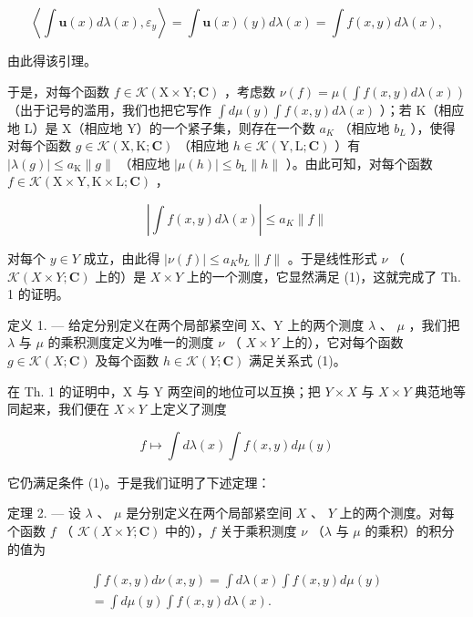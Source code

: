 \[
\left\langle \int \mathbf {u} (x) d \lambda (x), \varepsilon_ {y} \right\rangle = \int \mathbf {u} (x) (y) d \lambda (x) = \int f (x, y) d \lambda (x),
\]

由此得该引理。

于是，对每个函数 \(f \in \mathcal{K}(\mathrm{X} \times \mathrm{Y}; \mathbf{C})\) ，考虑数 \(\nu(f) = \mu\left(\int f(x, y) d\lambda(x)\right)\) （出于记号的滥用，我们也把它写作 \(\int d\mu(y) \int f(x, y) d\lambda(x)\) ）；若 K（相应地 L）是 X（相应地 Y）的一个紧子集，则存在一个数 \(a_{K}\) （相应地 \(b_{L}\) ），使得对每个函数 \(g \in \mathcal{K}(\mathrm{X}, \mathrm{K}; \mathbf{C})\) （相应地 \(h \in \mathcal{K}(\mathrm{Y}, \mathrm{L}; \mathbf{C})\) ）有 \(|\lambda(g)| \leqslant a_{\mathrm{K}} \|g\|\) （相应地 \(|\mu(h)| \leqslant b_{\mathrm{L}} \|h\|\) ）。由此可知，对每个函数 \(f \in \mathcal{K}(\mathrm{X} \times \mathrm{Y}, \mathrm{K} \times \mathrm{L}; \mathbf{C})\) ，

\[
\left| \int f (x, y) d \lambda (x) \right| \leqslant a _ {K} \| f \|
\]

对每个 \(y \in Y\) 成立，由此得 \(|\nu(f)| \leqslant a_{K}b_{L}\|f\|\) 。于是线性形式 \(\nu\) （ \(\mathcal{K}(X \times Y; \mathbf{C})\) 上的）是 \(X \times Y\) 上的一个测度，它显然满足 (1)，这就完成了 Th. 1 的证明。

定义 1. --- 给定分别定义在两个局部紧空间 X、Y 上的两个测度 \(\lambda\) 、 \(\mu\) ，我们把 \(\lambda\) 与 \(\mu\) 的乘积测度定义为唯一的测度 \(\nu\) （ \(X \times Y\) 上的），它对每个函数 \(g \in \mathcal{K}(X; \mathbf{C})\) 及每个函数 \(h \in \mathcal{K}(Y; \mathbf{C})\) 满足关系式 (1)。

在 Th. 1 的证明中，X 与 Y 两空间的地位可以互换；把 \(Y \times X\) 与 \(X \times Y\) 典范地等同起来，我们便在 \(X \times Y\) 上定义了测度

\[
f \mapsto \int d \lambda (x) \int f (x, y) d \mu (y)
\]

它仍满足条件 (1)。于是我们证明了下述定理：

定理 2. --- 设 \(\lambda\) 、 \(\mu\) 是分别定义在两个局部紧空间 \(X\) 、 \(Y\) 上的两个测度。对每个函数 \(f\) （ \(\mathcal{K}(X \times Y; \mathbf{C})\) 中的），\(f\) 关于乘积测度 \(\nu\) （\(\lambda\) 与 \(\mu\) 的乘积）的积分的值为

\[
\begin{array}{c} \int f (x, y) d \nu (x, y) = \int d \lambda (x) \int f (x, y) d \mu (y) \\ = \int d \mu (y) \int f (x, y) d \lambda (x). \end{array}\tag{3}
\]

